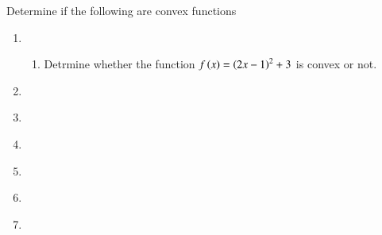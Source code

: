 Determine if the following are convex functions
\begin{enumerate}[label=\thechapter.\arabic*,ref=\thechapter.\theenumi]
\item
	\begin{enumerate}
\item Detrmine whether the function $f\left(x\right) = \left(2x-1\right)^2 + 3$ is convex or not. \\ 
\solution 
\label{12/6/5/1/1/conv}

	\end{enumerate}
\iffalse
\item
\label{12/6/5/2}
%
\item
\label{12/6/5/3}

\item
\label{12/6/5/4}

\item
\label{12/6/5/5}

\fi
\item
\label{12/6/5/6}

\item
\label{12/6/5/7}

\item
\label{12/6/5/8}

\iffalse
\item
\label{12/6/5/9}
%
\fi
\item
\label{12/6/5/10}

\item
\label{12/6/5/11}

\item
\label{12/6/6/14}


\end{enumerate}
